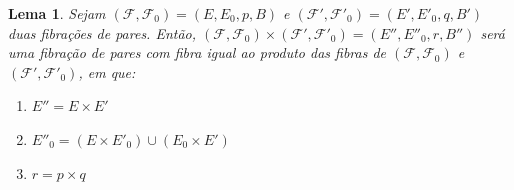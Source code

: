 \documentclass[12pt,oneside]{book} %
\newtheorem{lem}    {\hspace{0.5cm}Lema}[chapter]
\begin{document}
\begin{lem}\label{pf_produto}
	Sejam $(\mathcal{F},\mathcal{F}_{0})=(E,E_{0},p,B)$ e $(\mathcal{F'},\mathcal{F'}_{0})=(E',E'_{0},q,B')$ duas fibrações de pares. Então, $(\mathcal{F},\mathcal{F}_{0})\times(\mathcal{F'},\mathcal{F'}_{0})=(E'',E''_{0},r,B'')$ será uma fibração de pares com fibra igual ao produto das fibras de $(\mathcal{F},\mathcal{F}_{0})$ e $(\mathcal{F'},\mathcal{F'}_{0})$, em que:
	
	\begin{enumerate}
		\item $E''=E\times E'$
		\item $E''_{0}=(E\times E'_{0})\cup (E_{0}\times E')$
		\item $r=p\times q$
	\end{enumerate}
	
\end{lem}
\end{document}
